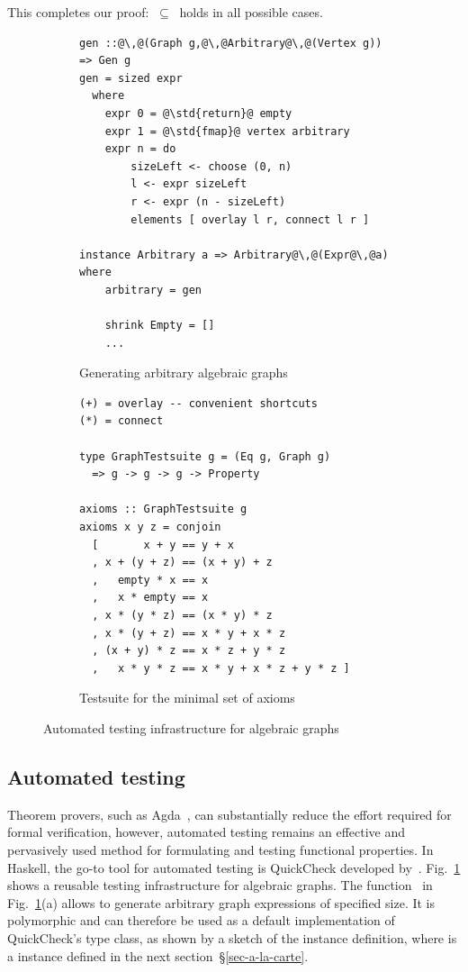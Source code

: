 \noindent
This completes our proof:  $\ \subseteq\ $ 
holds in all possible cases.

\begin{figure}[b]
\vspace{-2mm}
\begin{subfigure}[b]{0.48\linewidth}
\begin{verbatim}
gen ::@\,@(Graph g,@\,@Arbitrary@\,@(Vertex g)) => Gen g
gen = sized expr
  where
    expr 0 = @\std{return}@ empty
    expr 1 = @\std{fmap}@ vertex arbitrary
    expr n = do
        sizeLeft <- choose (0, n)
        l <- expr sizeLeft
        r <- expr (n - sizeLeft)
        elements [ overlay l r, connect l r ]

instance Arbitrary a => Arbitrary@\,@(Expr@\,@a) where
    arbitrary = gen

    shrink Empty = []
    ...
\end{verbatim}
\caption{Generating arbitrary algebraic graphs}
\end{subfigure}
\hfill
\hfill
\hfill
\vrule
\hfill
\begin{subfigure}[b]{0.45\linewidth}
\begin{verbatim}
(+) = overlay -- convenient shortcuts
(*) = connect

type GraphTestsuite g = (Eq g, Graph g)
  => g -> g -> g -> Property

axioms :: GraphTestsuite g
axioms x y z = conjoin
  [       x + y == y + x
  , x + (y + z) == (x + y) + z
  ,   empty * x == x
  ,   x * empty == x
  , x * (y * z) == (x * y) * z
  , x * (y + z) == x * y + x * z
  , (x + y) * z == x * z + y * z
  ,   x * y * z == x * y + x * z + y * z ]
\end{verbatim}
\caption{Testsuite for the minimal set of axioms}
\end{subfigure}
\vspace{-3mm}
\caption{Automated testing infrastructure for algebraic graphs\label{fig-testing}}
\end{figure}

\subsection{Automated testing}\label{sub-testing}

Theorem provers, such as Agda~\cite{2007_norell_agda},
can substantially reduce the effort required for formal verification,
however, automated testing remains an effective and pervasively used
method for formulating and testing functional properties. In Haskell,
the go-to tool for automated testing is QuickCheck developed
by~\citet{2011_quickcheck_claessen}.
Fig.~\ref{fig-testing} shows a reusable testing infrastructure for
algebraic graphs. The function~ in Fig.~\ref{fig-testing}(a)
allows to generate arbitrary graph expressions of specified size.
It is polymorphic and can therefore be used as a default implementation
of QuickCheck's  type class, as shown by a sketch of
the  instance definition, where 
is a  instance defined in the next section~\S\ref{sec-a-la-carte}.

